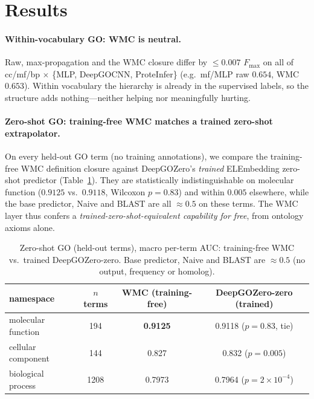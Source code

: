 \documentclass[11pt]{article}
\newcommand{\Fmax}{F_{\max}}
\begin{document}
\section{Results}\label{sec:results}
\paragraph{Within-vocabulary GO: WMC is neutral.}
Raw, max-propagation and the WMC closure differ by ${\le}0.007$ $\Fmax$ on all of cc/mf/bp $\times$
\{MLP, DeepGOCNN, ProteInfer\} (e.g.\ mf/MLP raw $0.654$, WMC $0.653$). Within vocabulary the
hierarchy is already in the supervised labels, so the structure adds nothing---neither helping
nor meaningfully hurting.

\paragraph{Zero-shot GO: training-free WMC matches a trained zero-shot extrapolator.}
On every held-out GO term (no training annotations), we compare the training-free WMC definition
closure against DeepGOZero's \emph{trained} ELEmbedding zero-shot predictor
\citep{kulmanov2022deepgozero} (Table~\ref{tab:zero}). They are statistically indistinguishable on
molecular function ($0.9125$ vs.\ $0.9118$, Wilcoxon $p=0.83$) and within $0.005$ elsewhere, while
the base predictor, Naive and BLAST are all ${\approx}0.5$ on these terms. The WMC layer thus
confers a \emph{trained-zero-shot-equivalent capability for free}, from ontology axioms alone.

\begin{table}[t]\centering
\caption{Zero-shot GO (held-out terms), macro per-term AUC: training-free WMC vs.\ trained
DeepGOZero-zero. Base predictor, Naive and BLAST are ${\approx}0.5$ (no output, frequency or
homolog).}\label{tab:zero}
\small
\begin{tabular}{lccc}
\toprule
namespace & $n$ terms & WMC (training-free) & DeepGOZero-zero (trained)\\
\midrule
molecular function & 194 & \textbf{0.9125} & 0.9118 \;($p{=}0.83$, tie)\\
cellular component & 144 & 0.827 & 0.832 \;($p{=}0.005$)\\
biological process & 1208 & 0.7973 & 0.7964 \;($p{=}2{\times}10^{-4}$)\\
\bottomrule
\end{tabular}
\end{table}
\end{document}

